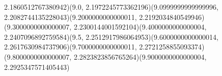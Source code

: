 2.1860512767380942)(9.0, 2.1972245773362196)(9.0999999999999996, 2.2082744135228043)(9.2000000000000011, 2.2192034840549946)(9.3000000000000007, 2.2300144001592104)(9.4000000000000004, 2.2407096892759584)(9.5, 2.2512917986064953)(9.6000000000000014, 2.2617630984737906)(9.7000000000000011, 2.2721258855093374)(9.8000000000000007, 2.2823823856765264)(9.9000000000000004, 2.2925347571405443)
\mycolor

\endpspicture
